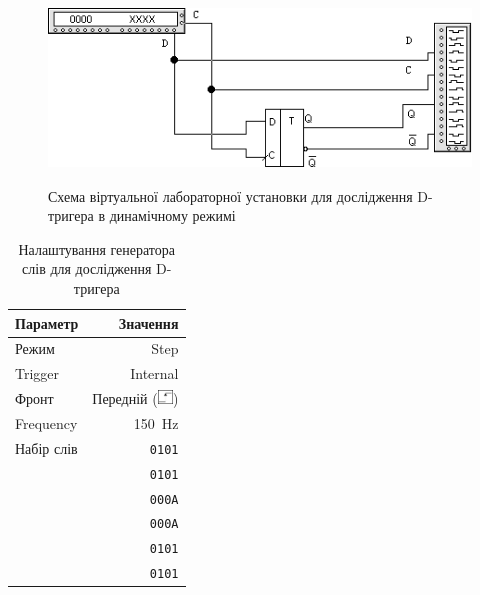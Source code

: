 \documentclass[a4paper,oneside,DIV=10,12pt]{scrartcl}
\newcommand\hexword[1]{\texttt{#1}}
\begin{document}
			\begin{figure}[!htbp]
			\centering
				\includegraphics[height = 50mm]{assets/04-02-d-flipflop-dynamic-mode-schematic.png}
			\caption{Схема віртуальної лабораторної установки для дослідження D-тригера в динамічному режимі}
			\label{fig:d-flipflop-dynamic-mode-schematic}
			\end{figure}
			
			\begin{table}[!htbp]
			\centering
				\begin{tabular}{lr}
					\toprule
						Параметр & Значення\\
					\midrule
						Режим & Step\\
						Trigger & Internal\\
						Фронт & Передній (\includegraphics[height=1em]{assets/front-setting-button.png})\\
						Frequency & 150~Hz\\
						Набір слів & \hexword{0101}\\
						           & \hexword{0101}\\
						           & \hexword{000A}\\
						           & \hexword{000A}\\
						           & \hexword{0101}\\
						           & \hexword{0101}\\
					\bottomrule
				\end{tabular}
			\caption{Налаштування генератора слів для дослідження D-тригера}
			\label{tab:d-flipflop-word-generator-settings}
			\end{table}
			
\end{document}
